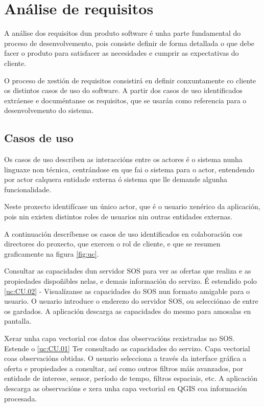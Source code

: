 \chapter{Análise de requisitos}

A análise dos requisitos dun produto software é unha parte fundamental do proceso de desenvolvemento, pois consiste definir de forma detallada o que debe facer o produto para satisfacer as necesidades e cumprir as expectativas do cliente.

O proceso de xestión de requisitos\cite{GPGR} consistirá en definir conxuntamente co cliente os distintos casos de uso do software. A partir dos casos de uso identificados extráense e documéntanse os requisitos, que se usarán como referencia para o desenvolvemento do sistema.

\section{Casos de uso}

Os casos de uso\cite{UseCase} describen as interaccións entre os actores é o sistema nunha linguaxe non técnica, centrándose en que fai o sistema para o actor, entendendo por actor calquera entidade externa ó sistema que lle demande algunha funcionalidade.

Neste proxecto identifícase un único actor, que é o usuario xenérico da aplicación, pois nin existen distintos roles de usuarios nin outras entidades externas.

A continuación descríbense os casos de uso identificados en colaboración cos directores do proxecto, que exercen o rol de cliente, e que se resumen graficamente na figura \ref{fig:uc}.

			{Consultar as capacidades dun servidor SOS para ver as ofertas que realiza e as propiedades dispoñibles nelas, e demais información do servizo.} %
			{É estendido polo \ref{uc:CU.02}} %
			{-} %
			{Visualízanse as capacidades do SOS nun formato amigable para o usuario.} %
			{O usuario introduce o enderezo do servidor SOS, ou selecciónao de entre os gardados. A aplicación descarga as capacidades do mesmo para amosalas en pantalla. 
			} %
			
			{Xerar unha capa vectorial cos datos das observacións rexistradas no SOS.} %
			{Estende o \ref{uc:CU.01}} %
			{Ter consultado as capacidades do servizo.} %
			{Capa vectorial coas observacións obtidas.} %
			{O usuario selecciona a través da interface gráfica a oferta e propiedades a consultar, así como outros filtros máis avanzados, por entidade de interese, sensor, período de tempo, filtros espaciais, etc. A aplicación descarga as observacións e xera unha capa vectorial en QGIS coa información procesada.
			} %

